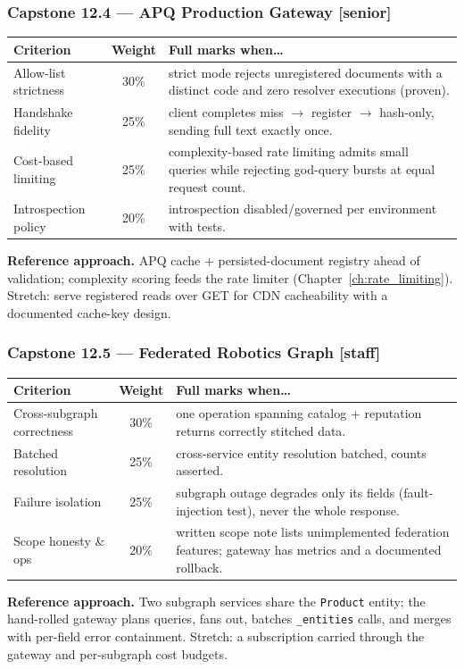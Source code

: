 \subsubsection*{Capstone 12.4 --- APQ Production Gateway [senior]}
\begin{center}\small
\begin{tabularx}{\textwidth}{l c X}
\toprule
\textbf{Criterion} & \textbf{Weight} & \textbf{Full marks when\ldots} \\
\midrule
Allow-list strictness & 30\% & strict mode rejects unregistered documents with a distinct code and zero resolver executions (proven). \\
Handshake fidelity & 25\% & client completes miss $\to$ register $\to$ hash-only, sending full text exactly once. \\
Cost-based limiting & 25\% & complexity-based rate limiting admits small queries while rejecting god-query bursts at equal request count. \\
Introspection policy & 20\% & introspection disabled/governed per environment with tests. \\
\bottomrule
\end{tabularx}
\end{center}
\textbf{Reference approach.} APQ cache + persisted-document registry ahead
of validation; complexity scoring feeds the rate limiter
(Chapter~\ref{ch:rate_limiting}). Stretch: serve registered reads over GET
for CDN cacheability with a documented cache-key design.

\subsubsection*{Capstone 12.5 --- Federated Robotics Graph [staff]}
\begin{center}\small
\begin{tabularx}{\textwidth}{l c X}
\toprule
\textbf{Criterion} & \textbf{Weight} & \textbf{Full marks when\ldots} \\
\midrule
Cross-subgraph correctness & 30\% & one operation spanning catalog + reputation returns correctly stitched data. \\
Batched resolution & 25\% & cross-service entity resolution batched, counts asserted. \\
Failure isolation & 25\% & subgraph outage degrades only its fields (fault-injection test), never the whole response. \\
Scope honesty \& ops & 20\% & written scope note lists unimplemented federation features; gateway has metrics and a documented rollback. \\
\bottomrule
\end{tabularx}
\end{center}
\textbf{Reference approach.} Two subgraph services share the
\texttt{Product} entity; the hand-rolled gateway plans queries, fans out,
batches \texttt{\_entities} calls, and merges with per-field error
containment. Stretch: a subscription carried through the gateway and
per-subgraph cost budgets.

